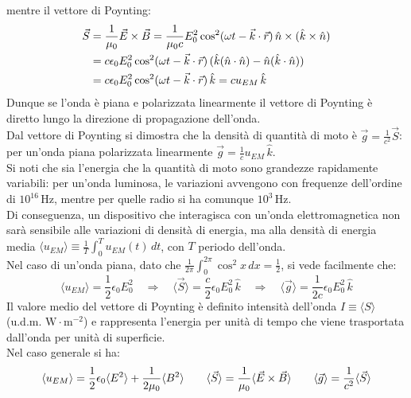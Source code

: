 mentre il vettore di Poynting:
\begin{equation}
	\begin{split}
		\vec{S} &= \frac{1}{\mu_0} \vec{E}\times\vec{B} = \frac{1}{\mu_0 c} E_0^2 \cos^2 (\omega t - \vec{k}\cdot\vec{r}) \,\hat{n}\times(\hat{k}\times\hat{n}) \\ 
			&= c \epsilon_0 E_0^2 \cos^2 (\omega t - \vec{k}\cdot\vec{r}) \, (\hat{k}(\hat{n}\cdot\hat{n}) - \hat{n}(\hat{k}\cdot\hat{n})) \\ 
			&= c \epsilon_0 E_0^2 \cos^2 (\omega t - \vec{k}\cdot\vec{r}) \,\hat{k} = c u_{EM} \,\hat{k}
	\end{split}
	\label{eq:41}
\end{equation}
Dunque se l'onda è piana e polarizzata linearmente il vettore di Poynting è diretto lungo la direzione di propagazione dell'onda. \\ 
%
Dal vettore di Poynting si dimostra che la densità di quantità di moto è $ \vec{g} = \frac{1}{c^2} \vec{S} $: per un'onda piana polarizzata linearmente $ \vec{g} = \frac{1}{c}u_{EM} \,\hat{k} $. \\ 
Si noti che sia l'energia che la quantità di moto sono grandezze rapidamente variabili: per un'onda luminosa, le variazioni avvengono con frequenze dell'ordine di $ 10^{16}\,\text{Hz} $, mentre per quelle radio si ha comunque $ 10^3\,\text{Hz} $. \\ 
Di conseguenza, un dispositivo che interagisca con un'onda elettromagnetica non sarà sensibile alle variazioni di densità di energia, ma alla densità di energia media $ \langle u_{EM} \rangle \equiv \frac{1}{T} \int_0^T u_{EM}(t) \,dt $, con $ T $ periodo dell'onda. \\ 
%
Nel caso di un'onda piana, dato che $ \frac{1}{2\pi} \int_0^{2\pi} \cos^2 x\,dx = \frac{1}{2} $, si vede facilmente che:
\begin{equation}
	\langle u_{EM} \rangle = \frac{1}{2} \epsilon_0 E_0^2 \quad\Longrightarrow\quad \langle \vec{S} \rangle = \frac{c}{2} \epsilon_0 E_0^2 \,\hat{k} \quad\Longrightarrow\quad \langle \vec{g} \rangle = \frac{1}{2c} \epsilon_0 E_0^2 \,\hat{k}
	\label{eq:42}
\end{equation}
Il valore medio del vettore di Poynting è definito intensità dell'onda $ I \equiv \langle S \rangle $ (u.d.m. $ \text{W}\cdot\text{m}^{-2} $) e rappresenta l'energia per unità di tempo che viene trasportata dall'onda per unità di superficie. \\ 
%
Nel caso generale si ha:
\begin{equation}
	\langle u_{EM} \rangle = \frac{1}{2} \epsilon_0 \langle E^2 \rangle + \frac{1}{2\mu_0} \langle B^2 \rangle \qquad \langle \vec{S} \rangle = \frac{1}{\mu_0} \langle \vec{E}\times\vec{B} \rangle \qquad \langle \vec{g} \rangle = \frac{1}{c^2} \langle \vec{S} \rangle
	\label{eq:43}
\end{equation}


